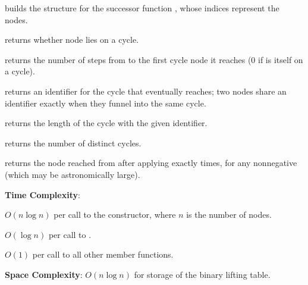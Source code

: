 \begin{compactitem}
  \item {} builds the structure for the successor function , whose indices represent the nodes.
  \item {} returns whether node  lies on a cycle.
  \item {} returns the number of steps from  to the first cycle node it reaches ($0$ if  is itself on a cycle).
  \item {} returns an identifier for the cycle that  eventually reaches; two nodes share an identifier exactly when they funnel into the same cycle.
  \item {} returns the length of the cycle with the given identifier.
  \item {} returns the number of distinct cycles.
  \item {} returns the node reached from  after applying  exactly  times, for any nonnegative  (which may be astronomically large).
\end{compactitem}

\textbf{Time Complexity}:
\begin{compactitem}
  \item $O(n \log n)$ per call to the constructor, where $n$ is the number of nodes.
  \item $O(\log n)$ per call to .
  \item $O(1)$ per call to all other member functions.
\end{compactitem}

\textbf{Space Complexity}: $O(n \log n)$ for storage of the binary lifting table.

